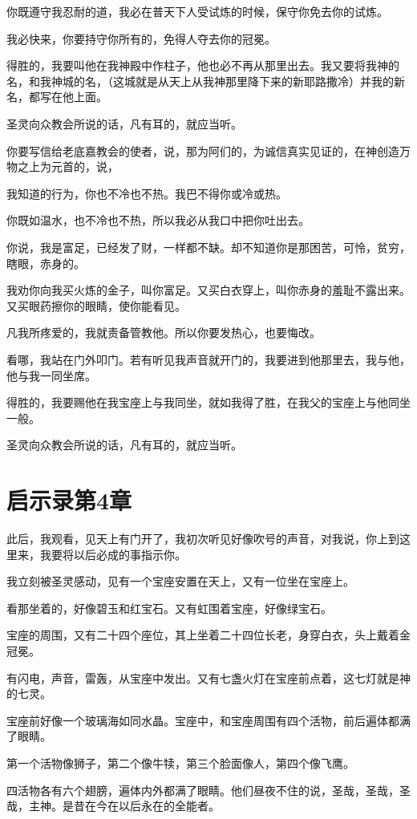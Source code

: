 \documentclass[12pt,oneside]{book}
\begin{document}
你既遵守我忍耐的道，我必在普天下人受试炼的时候，保守你免去你的试炼。

我必快来，你要持守你所有的，免得人夺去你的冠冕。

得胜的，我要叫他在我神殿中作柱子，他也必不再从那里出去。我又要将我神的名，和我神城的名，（这城就是从天上从我神那里降下来的新耶路撒冷）并我的新名，都写在他上面。

圣灵向众教会所说的话，凡有耳的，就应当听。

你要写信给老底嘉教会的使者，说，那为阿们的，为诚信真实见证的，在神创造万物之上为元首的，说，

我知道的行为，你也不冷也不热。我巴不得你或冷或热。

你既如温水，也不冷也不热，所以我必从我口中把你吐出去。

你说，我是富足，已经发了财，一样都不缺。却不知道你是那困苦，可怜，贫穷，瞎眼，赤身的。

我劝你向我买火炼的金子，叫你富足。又买白衣穿上，叫你赤身的羞耻不露出来。又买眼药擦你的眼睛，使你能看见。

凡我所疼爱的，我就责备管教他。所以你要发热心，也要悔改。

看哪，我站在门外叩门。若有听见我声音就开门的，我要进到他那里去，我与他，他与我一同坐席。

得胜的，我要赐他在我宝座上与我同坐，就如我得了胜，在我父的宝座上与他同坐一般。

圣灵向众教会所说的话，凡有耳的，就应当听。

\chapter{启示录第4章}
此后，我观看，见天上有门开了，我初次听见好像吹号的声音，对我说，你上到这里来，我要将以后必成的事指示你。

我立刻被圣灵感动，见有一个宝座安置在天上，又有一位坐在宝座上。

看那坐着的，好像碧玉和红宝石。又有虹围着宝座，好像绿宝石。

宝座的周围，又有二十四个座位，其上坐着二十四位长老，身穿白衣，头上戴着金冠冕。

有闪电，声音，雷轰，从宝座中发出。又有七盏火灯在宝座前点着，这七灯就是神的七灵。

宝座前好像一个玻璃海如同水晶。宝座中，和宝座周围有四个活物，前后遍体都满了眼睛。

第一个活物像狮子，第二个像牛犊，第三个脸面像人，第四个像飞鹰。

四活物各有六个翅膀，遍体内外都满了眼睛。他们昼夜不住的说，圣哉，圣哉，圣哉，主神。是昔在今在以后永在的全能者。
\end{document}
